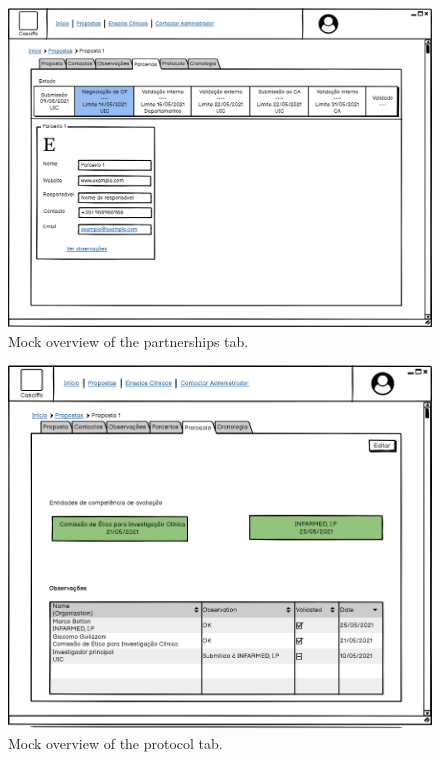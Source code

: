 \begin{figure}[H]
    \centering
    \includegraphics[scale=0.35]{images/proposta-parcerias.png}
    \caption{Mock overview of the partnerships tab.}
    \label{fig:proposta-parcerias}
\end{figure}

\begin{figure}[H]
    \centering
    \includegraphics[scale=0.35]{images/proposta-protocolo.png}
    \caption{Mock overview of the protocol tab.}
    \label{fig:proposta-protocolo}
\end{figure}

